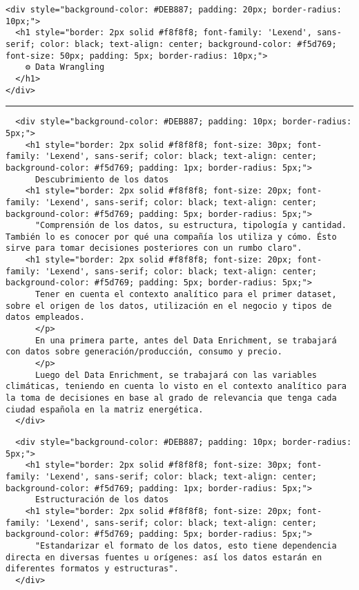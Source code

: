 \documentclass[11pt]{article}
\begin{document}
\begin{verbatim}
<div style="background-color: #DEB887; padding: 20px; border-radius: 10px;">
  <h1 style="border: 2px solid #f8f8f8; font-family: 'Lexend', sans-serif; color: black; text-align: center; background-color: #f5d769; font-size: 50px; padding: 5px; border-radius: 10px;">
    ⚙️ Data Wrangling
  </h1>
</div>
\end{verbatim}

\begin{center}\rule{0.5\linewidth}{0.5pt}\end{center}

    \begin{verbatim}
  <div style="background-color: #DEB887; padding: 10px; border-radius: 5px;">
    <h1 style="border: 2px solid #f8f8f8; font-size: 30px; font-family: 'Lexend', sans-serif; color: black; text-align: center; background-color: #f5d769; padding: 1px; border-radius: 5px;">
      Descubrimiento de los datos
    <h1 style="border: 2px solid #f8f8f8; font-size: 20px; font-family: 'Lexend', sans-serif; color: black; text-align: center; background-color: #f5d769; padding: 5px; border-radius: 5px;">
      "Comprensión de los datos, su estructura, tipología y cantidad. También lo es conocer por qué una compañía los utiliza y cómo. Ésto sirve para tomar decisiones posteriores con un rumbo claro".
    <h1 style="border: 2px solid #f8f8f8; font-size: 20px; font-family: 'Lexend', sans-serif; color: black; text-align: center; background-color: #f5d769; padding: 5px; border-radius: 5px;">
      Tener en cuenta el contexto analítico para el primer dataset, sobre el origen de los datos, utilización en el negocio y tipos de datos empleados.
      </p>
      En una primera parte, antes del Data Enrichment, se trabajará con datos sobre generación/producción, consumo y precio.
      </p>
      Luego del Data Enrichment, se trabajará con las variables climáticas, teniendo en cuenta lo visto en el contexto analítico para la toma de decisiones en base al grado de relevancia que tenga cada ciudad española en la matriz energética.
  </div>
\end{verbatim}

    \begin{verbatim}
  <div style="background-color: #DEB887; padding: 10px; border-radius: 5px;">
    <h1 style="border: 2px solid #f8f8f8; font-size: 30px; font-family: 'Lexend', sans-serif; color: black; text-align: center; background-color: #f5d769; padding: 1px; border-radius: 5px;">
      Estructuración de los datos
    <h1 style="border: 2px solid #f8f8f8; font-size: 20px; font-family: 'Lexend', sans-serif; color: black; text-align: center; background-color: #f5d769; padding: 5px; border-radius: 5px;">
      "Estandarizar el formato de los datos, esto tiene dependencia directa en diversas fuentes u orígenes: así los datos estarán en diferentes formatos y estructuras".
  </div>
\end{verbatim}
\end{document}
